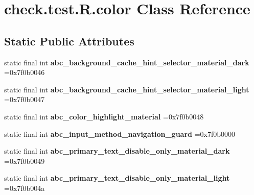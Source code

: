 \hypertarget{classcheck_1_1test_1_1_r_1_1color}{}\section{check.\+test.\+R.\+color Class Reference}
\label{classcheck_1_1test_1_1_r_1_1color}
\subsection*{Static Public Attributes}
\begin{DoxyCompactItemize}
\item 
\hypertarget{classcheck_1_1test_1_1_r_1_1color_ab5add565f93e6f299282118cc93cd086}{}static final int {\bfseries abc\+\_\+background\+\_\+cache\+\_\+hint\+\_\+selector\+\_\+material\+\_\+dark} =0x7f0b0046\label{classcheck_1_1test_1_1_r_1_1color_ab5add565f93e6f299282118cc93cd086}

\item 
\hypertarget{classcheck_1_1test_1_1_r_1_1color_a96e8e2b740fcf809a1c07dbfceffae83}{}static final int {\bfseries abc\+\_\+background\+\_\+cache\+\_\+hint\+\_\+selector\+\_\+material\+\_\+light} =0x7f0b0047\label{classcheck_1_1test_1_1_r_1_1color_a96e8e2b740fcf809a1c07dbfceffae83}

\item 
\hypertarget{classcheck_1_1test_1_1_r_1_1color_a5c8671d8f77a8d001a42985469f6471b}{}static final int {\bfseries abc\+\_\+color\+\_\+highlight\+\_\+material} =0x7f0b0048\label{classcheck_1_1test_1_1_r_1_1color_a5c8671d8f77a8d001a42985469f6471b}

\item 
\hypertarget{classcheck_1_1test_1_1_r_1_1color_a54612f23782a2e1b929162199a72ca6a}{}static final int {\bfseries abc\+\_\+input\+\_\+method\+\_\+navigation\+\_\+guard} =0x7f0b0000\label{classcheck_1_1test_1_1_r_1_1color_a54612f23782a2e1b929162199a72ca6a}

\item 
\hypertarget{classcheck_1_1test_1_1_r_1_1color_a95a60b83522e122031890a523b0394f0}{}static final int {\bfseries abc\+\_\+primary\+\_\+text\+\_\+disable\+\_\+only\+\_\+material\+\_\+dark} =0x7f0b0049\label{classcheck_1_1test_1_1_r_1_1color_a95a60b83522e122031890a523b0394f0}

\item 
\hypertarget{classcheck_1_1test_1_1_r_1_1color_a2e890b8b3a4949ca9a162748fc395eb9}{}static final int {\bfseries abc\+\_\+primary\+\_\+text\+\_\+disable\+\_\+only\+\_\+material\+\_\+light} =0x7f0b004a\label{classcheck_1_1test_1_1_r_1_1color_a2e890b8b3a4949ca9a162748fc395eb9}


\end{DoxyCompactItemize}
